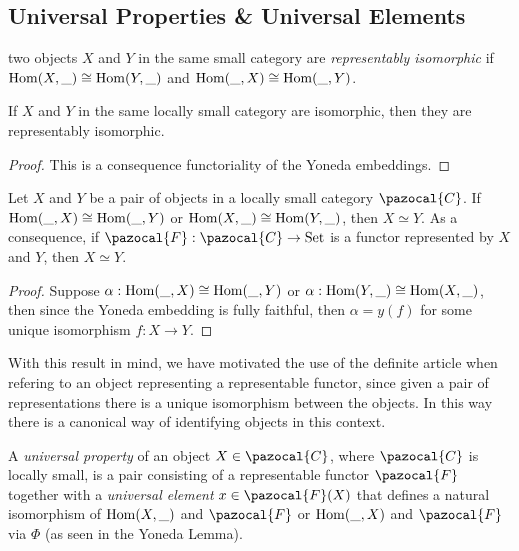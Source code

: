 \subsection{Universal Properties \& Universal Elements}
\begin{definition}
    two objects $X$ and $Y$ in the same small category are \emph{representably isomorphic} if $\mathrm{Hom}(X,\_)\cong \mathrm{Hom}(Y,\_)$ and $\mathrm{Hom}(\_,X)\cong\mathrm{Hom}(\_,Y)$.
\end{definition}
\begin{lemma}
    If $X$ and $Y$ in the same locally small category are isomorphic, then they are representably isomorphic.  
\end{lemma}
\begin{proof}
    This is a consequence functoriality of the Yoneda embeddings. 
\end{proof}
\begin{lemma}
    Let $X$ and $Y$ be a pair of objects in a locally small category $\pazocal{C}$. If $\mathrm{Hom}(\_,X)\cong \mathrm{Hom}(\_,Y)$ or $\mathrm{Hom}(X,\_)\cong \mathrm{Hom}(Y,\_)$, then $X\simeq Y$. As a consequence, if $\pazocal{F} : \pazocal{C}\rightarrow \mathrm{Set}$ is a functor represented by $X$ and $Y$, then $X\simeq Y$.
\end{lemma}
\begin{proof}
    Suppose $\alpha: \mathrm{Hom}(\_,X)\cong \mathrm{Hom}(\_,Y)$ or $\alpha: \mathrm{Hom}(Y,\_)\cong \mathrm{Hom}(X,\_)$, then since the Yoneda embedding is fully faithful, then $\alpha = y(f)$ for some unique isomorphism $f: X\rightarrow Y$.  
\end{proof}
\begin{remark}
    With this result in mind, we have motivated the use of the definite article when refering to an object representing a representable functor, since given a pair of representations there is a unique isomorphism between the objects. In this way there is a canonical way of identifying objects in this context.   
\end{remark}
\begin{definition}
    A \emph{universal property} of an object $X\in \pazocal{C}$, where $\pazocal{C}$ is locally small, is a pair consisting of a representable functor $\pazocal{F}$ together with a \emph{universal element} $x\in \pazocal{F}(X)$ that defines a natural isomorphism of $\mathrm{Hom}(X,\_)$ and $\pazocal{F}$ or $\mathrm{Hom}(\_,X)$ and $\pazocal{F}$ via $\Phi$ (as seen in the Yoneda Lemma). 
\end{definition}
